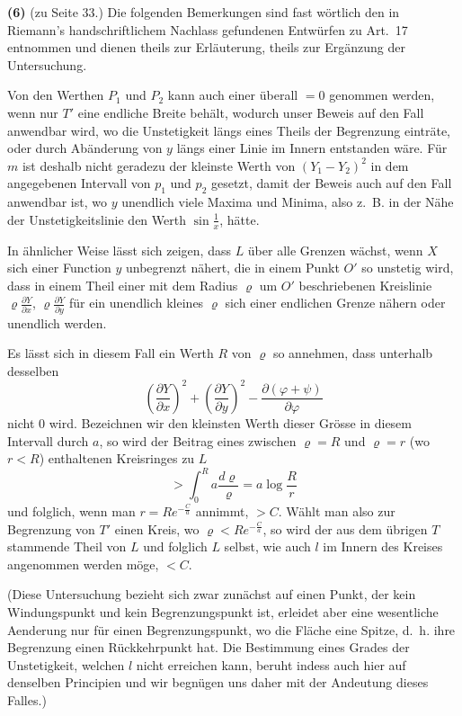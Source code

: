 \documentclass[12pt,a4paper]{article}
\begin{document}
\textbf{(6)} (zu Seite 33.) Die folgenden Bemerkungen sind fast wörtlich den in Riemann's handschriftlichem Nachlass gefundenen Entwürfen zu Art.~17 entnommen und dienen theils zur Erläuterung, theils zur Ergänzung der Untersuchung.

Von den Werthen $P_1$ und $P_2$ kann auch einer überall $= 0$ genommen werden, wenn nur $T'$ eine endliche Breite behält, wodurch unser Beweis auf den Fall anwendbar wird, wo die Unstetigkeit längs eines Theils der Begrenzung einträte, oder durch Abänderung von $y$ längs einer Linie im Innern entstanden wäre. Für $m$ ist deshalb nicht geradezu der kleinste Werth von $(Y_1 - Y_2)^2$ in dem angegebenen Intervall von $p_1$ und $p_2$ gesetzt, damit der Beweis auch auf den Fall anwendbar ist, wo $y$ unendlich viele Maxima und Minima, also z.~B. in der Nähe der Unstetigkeitslinie den Werth $\sin \frac{1}{x}$, hätte.

In ähnlicher Weise lässt sich zeigen, dass $L$ über alle Grenzen wächst, wenn $X$ sich einer Function $y$ unbegrenzt nähert, die in einem Punkt $O'$ so unstetig wird, dass in einem Theil einer mit dem Radius $\varrho$ um $O'$ beschriebenen Kreislinie $\varrho \frac{\partial Y}{\partial x}$, $\varrho \frac{\partial Y}{\partial y}$ für ein unendlich kleines $\varrho$ sich einer endlichen Grenze nähern oder unendlich werden.

Es lässt sich in diesem Fall ein Werth $R$ von $\varrho$ so annehmen, dass unterhalb desselben
\[
\left(\frac{\partial Y}{\partial x}\right)^2 + \left(\frac{\partial Y}{\partial y}\right)^2 - \frac{\partial (\varphi + \psi)}{\partial \varphi}
\]
nicht $0$ wird. Bezeichnen wir den kleinsten Werth dieser Grösse in diesem Intervall durch $a$, so wird der Beitrag eines zwischen $\varrho = R$ und $\varrho = r$ (wo $r < R$) enthaltenen Kreisringes zu $L$
\[
> \int_0^R a \frac{d\varrho}{\varrho} = a \log \frac{R}{r}
\]
und folglich, wenn man $r = R e^{-\frac{C}{a}}$ annimmt, $> C$. Wählt man also zur Begrenzung von $T'$ einen Kreis, wo $\varrho < R e^{-\frac{C}{a}}$, so wird der aus dem übrigen $T$ stammende Theil von $L$ und folglich $L$ selbst, wie auch $l$ im Innern des Kreises angenommen werden möge, $< C$.

(Diese Untersuchung bezieht sich zwar zunächst auf einen Punkt, der kein Windungspunkt und kein Begrenzungspunkt ist, erleidet aber eine wesentliche Aenderung nur für einen Begrenzungspunkt, wo die Fläche eine Spitze, d.~h. ihre Begrenzung einen Rückkehrpunkt hat. Die Bestimmung eines Grades der Unstetigkeit, welchen $l$ nicht erreichen kann, beruht indess auch hier auf denselben Principien und wir begnügen uns daher mit der Andeutung dieses Falles.)
\end{document}
